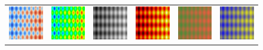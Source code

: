 \documentclass{acmsiggraph}               %
\begin{document}
\begin{figure}
\begin{tabular}{c@{\;}c@{\;}c@{\;}c@{\;}c@{\;}c}
    \includegraphics[width=1.1in]{images/Cool2WarmLfSensitivity} &
    \includegraphics[width=1.1in]{images/RainbowLfSensitivity} &
    \includegraphics[width=1.1in]{images/GrayscaleLfSensitivity} &
    \includegraphics[width=1.1in]{images/BlackBodyLfSensitivity} &
    \includegraphics[width=1.1in]{images/Green2RedLfSensitivity} &
    \includegraphics[width=1.1in]{images/Blue2YellowLfSensitivity} \\


\end{tabular}
\end{figure}
\end{document}
